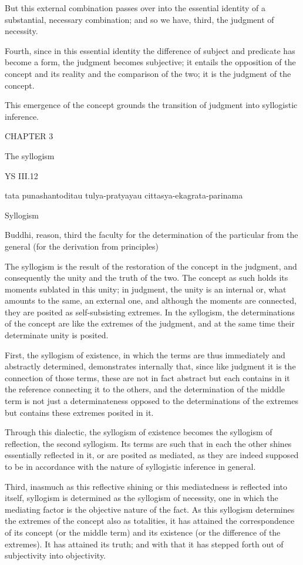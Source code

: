 But this external combination passes over
into the essential identity of a substantial, necessary combination;
and so we have, third, the judgment of necessity.

Fourth, since in this essential identity
the difference of subject and predicate has become a form,
the judgment becomes subjective;
it entails the opposition of the concept and its reality
and the comparison of the two;
it is the judgment of the concept.

This emergence of the concept grounds
the transition of judgment into syllogistic inference.

CHAPTER 3

The syllogism

YS III.12

    tata punashantoditau tulya-pratyayau cittasya-ekagrata-parinama

    Syllogism

    Buddhi, reason, third the faculty for the determination
    of the particular from the general (for the derivation from principles)

The syllogism is the result of
the restoration of the concept in the judgment,
and consequently the unity and the truth of the two.
The concept as such holds its moments
sublated in this unity;
in judgment, the unity is an internal
or, what amounts to the same, an external one,
and although the moments are connected,
they are posited as self-subsisting extremes.
In the syllogism, the determinations of the concept
are like the extremes of the judgment,
and at the same time their determinate unity is posited.

First, the syllogism of existence,
in which the terms are thus
immediately and abstractly determined,
demonstrates internally that,
since like judgment it is
the connection of those terms,
these are not in fact abstract
but each contains in it the reference
connecting it to the others,
and the determination of the middle term is
not just a determinateness opposed to the
determinations of the extremes
but contains these extremes posited in it.

Through this dialectic,
the syllogism of existence becomes
the syllogism of reflection, the second syllogism.
Its terms are such that in each the other
shines essentially reflected in it,
or are posited as mediated,
as they are indeed supposed to be
in accordance with the nature of
syllogistic inference in general.

Third, inasmuch as this reflective shining
or this mediatedness is reflected into itself,
syllogism is determined as the syllogism of necessity,
one in which the mediating factor is
the objective nature of the fact.
As this syllogism determines the extremes
of the concept also as totalities,
it has attained the correspondence
of its concept (or the middle term)
and its existence (or the difference of the extremes).
It has attained its truth;
and with that it has stepped forth
out of subjectivity into objectivity.

